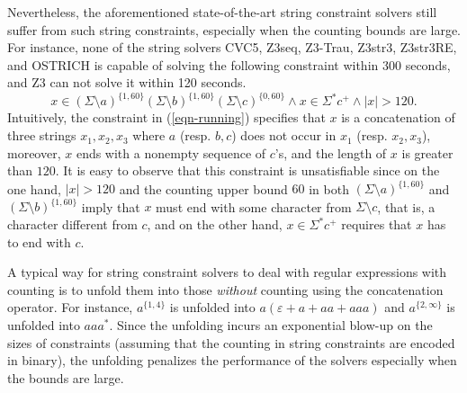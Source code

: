 Nevertheless, the aforementioned state-of-the-art string constraint solvers still suffer from such string constraints, especially when the counting bounds are large. For instance, none of the string solvers CVC5, Z3seq, Z3-Trau, Z3str3, Z3str3RE, and OSTRICH is capable of solving the following constraint within 300 seconds, and Z3 can not solve it within 120 seconds.
%
\begin{equation}\label{eqn-running}
x \in (\Sigma \setminus a)^{\{1, 60\}} (\Sigma \setminus b)^{\{1, 60\}} (\Sigma \setminus c)^{\{0, 60\}} \wedge x \in \Sigma^* c^+ \wedge |x| > 120.
\end{equation}
Intuitively, the constraint in (\ref{eqn-running}) specifies that $x$ is a concatenation of three strings $x_1, x_2, x_3$ where $a$ (resp. $b, c$) does not occur in $x_1$ (resp. $x_2, x_3$), moreover, $x$ ends with a nonempty sequence of $c$'s, and the length of $x$ is greater than $120$. It is easy to observe that this constraint is unsatisfiable since on the one hand, $|x| > 120$ and the counting upper bound $60$ in both $(\Sigma \setminus a)^{\{1, 60\}}$ and $(\Sigma \setminus b)^{\{1, 60\}}$ imply that $x$ must end with some character from $\Sigma \setminus c$, that is, a character different from $c$, and on the other hand, $x \in \Sigma^*c^+$ requires that $x$ has to end with $c$.

A typical way for string constraint solvers to deal with regular expressions with counting is to unfold them into those \emph{without} counting using the concatenation operator. For instance, $a^{\{1, 4\}}$ is unfolded into $a(\varepsilon + a + aa + aaa)$ and $a^{\{2,\infty\}}$ is unfolded into $aaa^{*}$. Since the unfolding incurs an exponential blow-up on the sizes of constraints (assuming that the counting in string constraints are encoded in binary), the unfolding penalizes the performance of the solvers especially when the bounds are large. 


